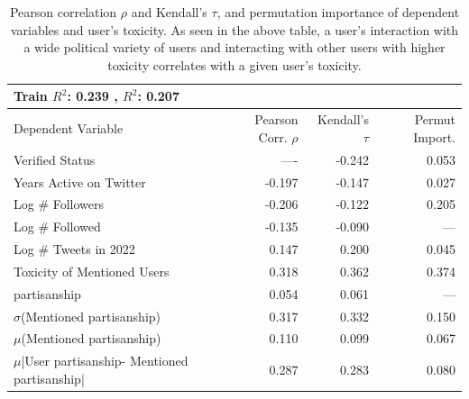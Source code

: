 \begin{table}
    \small
    \centering
    \begin{tabularx}{0.90\columnwidth}{l|rrr}
    Train $R^2$:  0.239 ,   $R^2$:  0.207  \\
    \toprule
      Dependent Variable  & Pearson Corr. $\rho$ & Kendall's $\tau$  & Permut Import. \\    \midrule
  Verified Status & ---- &-0.242 & 0.053  \\
  Years Active on Twitter & -0.197& -0.147 & 0.027 \\
  Log \# Followers & -0.206 &-0.122 & 0.205  \\
  Log \# Followed & -0.135 & -0.090 & --- \\
  Log \# Tweets in 2022 & 0.147 & 0.200  & 0.045\\
  Toxicity of Mentioned Users& 0.318& 0.362 & 0.374 \\
  partisanship  &0.054& 0.061 & --- \\
  $\sigma$(Mentioned partisanship)&0.317& 0.332	& 0.150\\
   $\mu$(Mentioned partisanship) & 0.110 &0.099 & 0.067  \\
  $\mu$|User partisanship- Mentioned partisanship|&0.287& 0.283 & 0.080\\


    
    \bottomrule
    \end{tabularx}
  \caption{Pearson correlation $\rho$ and Kendall's $\tau$, and permutation importance of dependent variables and user's toxicity. As seen in the above table, a user's interaction with a wide political variety of users and interacting with other users with higher toxicity correlates with a given user's toxicity. } 
   \vspace{-15pt}
   \label{table:importance-user-toxicity}
\end{table}





